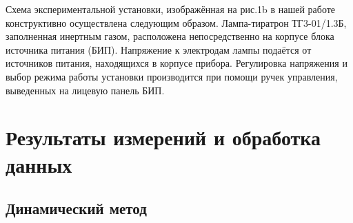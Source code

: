 \documentclass[12pt,a4paper]{article}
\begin{document}
	Схема экспериментальной установки, изображённая на рис.1b в нашей работе конструктивно осуществлена следующим образом. Лампа-тиратрон ТГ3-01/1.3Б, заполненная инертным газом, расположена непосредственно на корпусе блока источника питания (БИП). Напряжение к электродам лампы подаётся от источников питания, находящихся в корпусе прибора. Регулировка напряжения и выбор режима работы установки производится при помощи ручек управления, выведенных на лицевую панель БИП.
	



\section{Результаты измерений и обработка данных}

\subsection{Динамический метод}
\end{document}
